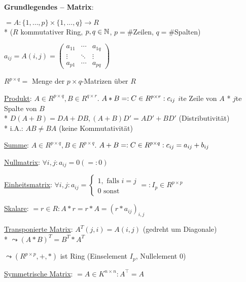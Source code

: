   \textbf{Grundlegendes -- Matrix}:
  \begin{items}
    \item $=A:\{ 1,\dots,p \} \times \{ 1,\dots,q \} \rightarrow R$ \\* ($R$ kommutativer Ring, $p,q \in \mathbb{N}$, $p=\#$Zeilen, $q=\#$Spalten)
    \item $a_{ij}=A(i,j)=\begin{pmatrix} a_{11} & \cdots & a_{1q} \\ \vdots & \ddots & \vdots \\ a_{p1} & \cdots & a_{pq} \end{pmatrix}$
    \item $R^{p \times q} =$ Menge der $p \times q$-Matrizen über $R$
    \item \underline{Produkt}: $A \in R^{p \times q}, B \in R^{q \times r}$. $A*B=:C \in R^{p \times r}: \\* c_{ij}$ $i$te Zeile von $A$ * $j$te Spalte von $B$ \\* $D(A+B)=DA+DB, (A+B)D' = AD'+BD'$ (Distributivität) \\* i.A.: $AB \neq BA$ (keine Kommutativität)
    \item \underline{Summe}: $A \in R^{p \times q}, B \in R^{p \times q}$. $A+B=:C \in R^{p \times q}: \\* c_{ij} = a_{ij}+b_{ij}$
    \item \underline{Nullmatrix}: $\forall i,j: a_{ij}=0 (=: 0)$
    \item \underline{Einheitsmatrix}: $\forall i,j: a_{ij}=\begin{cases} 1, \text{ falls } i=j \\ 0 \text{ sonst} \end{cases}=: I_p \in R^{p \times p}$
    \item \underline{Skalare}: $=r \in R: A*r=r*A=(r*a_{ij})_{i,j}$
    \item \underline{Transponierte Matrix}: $A^{T}(j,i)=A(i,j)$ (gedreht um Diagonale) \\* $\leadsto (A*B)^T=B^T*A^T$
    \item $\leadsto (R^{p \times p},+,*)$ ist Ring (Einselement $I_p$, Nullelement $0$)
    \item \underline{Symmetrische Matrix}: \( = A \in K^{n \times n}: A^\top  = A \)
  \end{items}

